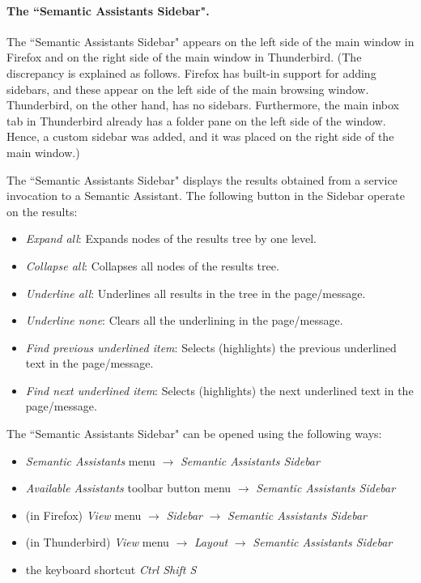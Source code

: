 \paragraph{The ``Semantic Assistants Sidebar".} The ``Semantic Assistants Sidebar" appears on the left side of the main window in Firefox and on the right side of the main window in Thunderbird. (The discrepancy is explained as follows. Firefox has built-in support for adding sidebars, and these appear on the left side of the main browsing window. Thunderbird, on the other hand, has no sidebars. Furthermore, the main inbox tab in Thunderbird already has a folder pane on the left side of the window. Hence, a custom sidebar was added, and it was placed on the right side of the main window.) 

The ``Semantic Assistants Sidebar" displays the results obtained from a service invocation to a Semantic Assistant. The following button in the Sidebar operate on the results: 
\begin{itemize} 
  \item \emph{Expand all}: Expands nodes of the results tree by one level.
  \item \emph{Collapse all}: Collapses all nodes of the results tree.
  \item \emph{Underline all}: Underlines all results in the tree in the page/message.
  \item \emph{Underline none}: Clears all the underlining in the page/message.
  \item \emph{Find previous underlined item}: Selects (highlights) the previous underlined text in the page/message.
  \item \emph{Find next underlined item}: Selects (highlights) the next underlined text in the page/message.
\end{itemize} 
The ``Semantic Assistants Sidebar" can be opened using the following ways: 
\begin{itemize} 
  \item \emph{Semantic Assistants} menu $\rightarrow$ \emph{Semantic Assistants Sidebar}
  \item \emph{Available Assistants} toolbar button menu $\rightarrow$ \emph{Semantic Assistants Sidebar}
  \item (in Firefox) \emph{View} menu $\rightarrow$ \emph{Sidebar} $\rightarrow$ \emph{Semantic Assistants Sidebar}
  \item (in Thunderbird) \emph{View} menu $\rightarrow$ \emph{Layout} $\rightarrow$ \emph{Semantic Assistants Sidebar}
  \item the keyboard shortcut \emph{Ctrl Shift S}
\end{itemize} 

